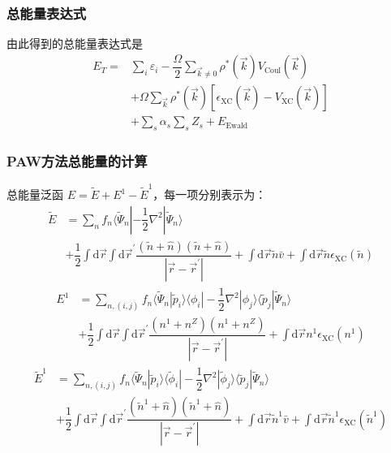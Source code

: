 \documentclass[cjk,slidestop,compress,mathserif,blue]{beamer}
\begin{document}
\frame
{
	\frametitle{总能量表达式}
由此得到的总能量表达式是
\begin{displaymath}
	\begin{aligned}
		E_T=&\sum_i\varepsilon_i-\dfrac{\Omega}2\sum_{\vec k\neq0}\rho^{\ast}(\vec k)V_{\mathrm{Coul}}(\vec k)\\
		&+\Omega\sum_{\vec k}\rho^{\ast}(\vec k)[\epsilon_{\mathrm{XC}}(\vec k)-V_{\mathrm{XC}}(\vec k)]\\
		&+\sum_s\alpha_s\sum_sZ_s+E_{\mathrm{Ewald}}
	\end{aligned}
\end{displaymath}
}

\frame
{
\frametitle{\textrm{PAW}方法总能量的计算}
总能量泛函
$E=\tilde E+E^1-\tilde E^1$，每一项分别表示为：
\begin{displaymath}
	\begin{aligned}
		\tilde E&=\sum_nf_n\langle\tilde\Psi_n|-\dfrac12\nabla^2|\tilde\Psi_n\rangle\\
		 &+\dfrac12\int\mathrm{d}\vec r\int\mathrm{d}\vec r^{\prime}\dfrac{(\tilde n+\hat n)(\tilde n+\hat n)}{|\vec r-\vec r^{\prime}|}+\int\mathrm{d}\vec r \tilde n\bar v+\int\mathrm{d}\vec r \tilde n\epsilon_{\mathrm{XC}}(\tilde n)
 	\end{aligned}
\end{displaymath}
\begin{displaymath}
	\begin{aligned}
		E^1&=\sum_{n,(i,j)}f_n\langle\tilde\Psi_n|\tilde p_i\rangle\langle\phi_i|-\dfrac12\nabla^2|\phi_j\rangle\langle\tilde p_j|\tilde\Psi_n\rangle\\
		 &+\dfrac12\int\mathrm{d}\vec r\int\mathrm{d}\vec r^{\prime}\dfrac{(n^1+n^Z)(n^1+n^Z)}{|\vec r-\vec r^{\prime}|}+\int\mathrm{d}\vec r n^1\epsilon_{\mathrm{XC}}(n^1)
 	\end{aligned}
\end{displaymath}
\begin{displaymath}
	\begin{aligned}
		\tilde E^1&=\sum_{n,(i,j)}f_n\langle\tilde\Psi_n|\tilde p_i\rangle\langle\tilde\phi_i|-\dfrac12\nabla^2|\tilde\phi_j\rangle\langle\tilde p_j|\tilde\Psi_n\rangle\\
		 &+\dfrac12\int\mathrm{d}\vec r\int\mathrm{d}\vec r^{\prime}\dfrac{(\tilde n^1+\hat n)(\tilde n^1+\hat n)}{|\vec r-\vec r^{\prime}|}+\int\mathrm{d}\vec r \tilde n^1\bar v+\int\mathrm{d}\vec r \tilde n^1\epsilon_{\mathrm{XC}}(\tilde n^1)
 	\end{aligned}
\end{displaymath}
}
\end{document}
